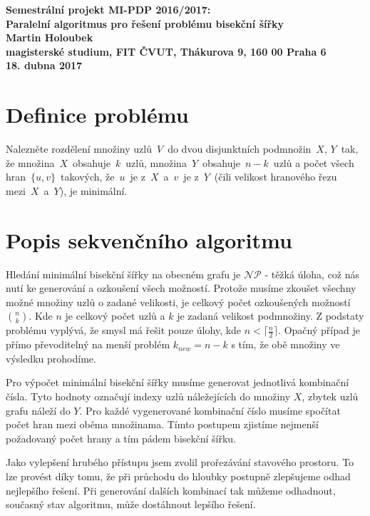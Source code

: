 \documentclass{article}
\begin{document}
	
\begin{center}
\bf Semestrální projekt MI-PDP 2016/2017:\\[5mm]
    Paralelní algoritmus pro řešení problému bisekční šířky\\[5mm] 
       Martin Holoubek\\[2mm]
magisterské studium, FIT ČVUT, Thákurova 9, 160 00 Praha 6\\[2mm]
18. dubna 2017
\end{center}

\section{Definice problému}
Nalezněte rozdělení množiny uzlů $V$ do dvou disjunktních podmnožin $X$, $Y$ tak, že množina $X$ obsahuje $k$ uzlů, množina $Y$ obsahuje $n-k$ uzlů a počet všech hran $\{u,v\}$ takových, že $u$ je z $X$ a $v$ je z $Y$ (čili velikost hranového řezu mezi $X$ a $Y$), je minimální.

\section{Popis sekvenčního algoritmu}
Hledání minimální bisekční šířky na obecném grafu je $\mathcal{NP}$ - těžká úloha, což nás nutí ke generování a ozkoušení všech možností. Protože musíme zkoušet všechny možné množiny uzlů o zadané velikosti, je celkový počet ozkoušených možností $\binom{n}{k}$. Kde $n$ je celkový počet uzlů a $k$ je zadaná velikost podmnožiny. Z podstaty problému vyplývá, že smysl má řešit pouze úlohy, kde $n< \lceil \frac{n}{2} \rceil$. Opačný případ je přímo převoditelný na menší problém $k_{new}=n-k$ s tím, že obě množiny ve výsledku prohodíme.


Pro výpočet minimální bisekční šířky musíme generovat jednotlivá kombinační čísla. Tyto hodnoty označují indexy uzlů náležejících do množiny $X$, zbytek uzlů grafu náleží do $Y$. Pro každé vygenerované kombinační číslo musíme spočítat počet hran mezi oběma množinama. Tímto postupem zjistíme nejmenší požadovaný počet hrany a tím pádem bisekční šířku.

Jako vylepšení hrubého přístupu jsem zvolil prořezávání stavového prostoru. To lze provést díky tomu, že při průchodu do hloubky postupně zlepšujeme odhad nejlepšího řešení. Při generování dalších kombinací tak můžeme odhadnout, současný stav algoritmu, může dostáhnout lepšího řešení. 
\end{document}
